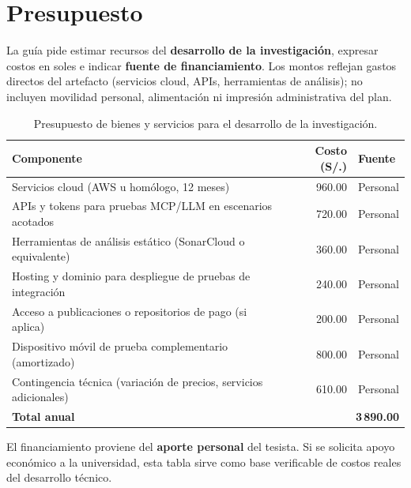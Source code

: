 \section{Presupuesto}
\label{chap:presupuesto}

La guía pide estimar recursos del \textbf{desarrollo de la investigación}, expresar costos en soles e indicar \textbf{fuente de financiamiento}. Los montos reflejan gastos directos del artefacto (servicios cloud, APIs, herramientas de análisis); no incluyen movilidad personal, alimentación ni impresión administrativa del plan.

\begin{table}[h]
\centering
\small
\caption{Presupuesto de bienes y servicios para el desarrollo de la investigación.}
\label{tabla:presupuesto}
\begin{tabular}{p{6.2cm}r p{3.2cm}}
\toprule
\textbf{Componente} & \textbf{Costo (S/.)} & \textbf{Fuente} \\
\midrule
Servicios cloud (AWS u homólogo, 12 meses) & 960.00 & Personal \\
APIs y tokens para pruebas MCP/LLM en escenarios acotados & 720.00 & Personal \\
Herramientas de análisis estático (SonarCloud o equivalente) & 360.00 & Personal \\
Hosting y dominio para despliegue de pruebas de integración & 240.00 & Personal \\
Acceso a publicaciones o repositorios de pago (si aplica) & 200.00 & Personal \\
Dispositivo móvil de prueba complementario (amortizado) & 800.00 & Personal \\
Contingencia técnica (variación de precios, servicios adicionales) & 610.00 & Personal \\
\midrule
\textbf{Total anual} & \multicolumn{2}{r}{\textbf{3\,890.00}} \\
\bottomrule
\end{tabular}
\end{table}

El financiamiento proviene del \textbf{aporte personal} del tesista. Si se solicita apoyo económico a la universidad, esta tabla sirve como base verificable de costos reales del desarrollo técnico.
